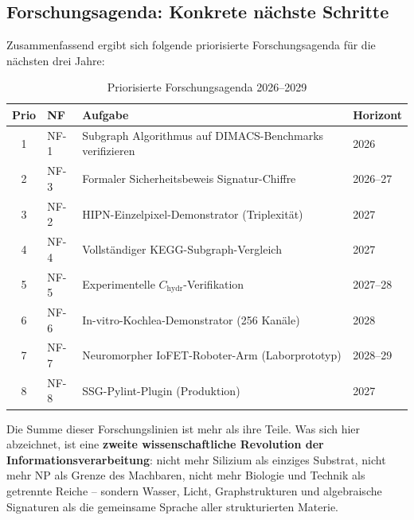 ﻿\documentclass[a4paper,12pt]{scrreprt}
\theoremstyle{definition}
\begin{document}
\subsection{Forschungsagenda: Konkrete nächste Schritte}

Zusammenfassend ergibt sich folgende priorisierte Forschungsagenda
für die nächsten drei Jahre:

\begin{table}[H]
\centering
\small
\caption{Priorisierte Forschungsagenda 2026--2029}
\label{tab:agenda}
\begin{tabular}{clp{6cm}l}
\toprule
\textbf{Prio} & \textbf{NF} & \textbf{Aufgabe} & \textbf{Horizont} \\
\midrule
1 & NF-1 & Subgraph Algorithmus auf DIMACS-Benchmarks verifizieren & 2026 \\
2 & NF-3 & Formaler Sicherheitsbeweis Signatur-Chiffre & 2026--27 \\
3 & NF-2 & HIPN-Einzelpixel-Demonstrator (Triplexität) & 2027 \\
4 & NF-4 & Vollständiger KEGG-Subgraph-Vergleich & 2027 \\
5 & NF-5 & Experimentelle $C_\mathrm{hydr}$-Verifikation & 2027--28 \\
6 & NF-6 & In-vitro-Kochlea-Demonstrator (256 Kanäle) & 2028 \\
7 & NF-7 & Neuromorpher IoFET-Roboter-Arm (Laborprototyp) & 2028--29 \\
8 & NF-8 & SSG-Pylint-Plugin (Produktion) & 2027 \\
\bottomrule
\end{tabular}
\end{table}

\bigskip
\noindent
Die Summe dieser Forschungslinien ist mehr als ihre Teile. Was sich
hier abzeichnet, ist eine \textbf{zweite wissenschaftliche Revolution
der Informationsverarbeitung}: nicht mehr Silizium als einziges
Substrat, nicht mehr NP als Grenze des Machbaren, nicht mehr
Biologie und Technik als getrennte Reiche -- sondern
Wasser, Licht, Graphstrukturen und algebraische Signaturen als
die gemeinsame Sprache aller
strukturierten Materie.
\end{document}
